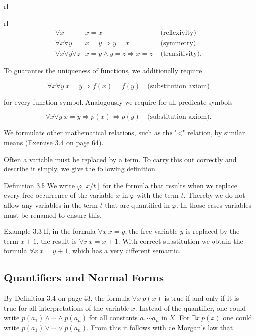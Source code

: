 \documentclass[10pt]{book}
\begin{document}
\begin{center}
\begin{tabular}{rl}
\begin{tabular}{rl}
\[
\begin{array}{rll}
\forall x & x=x & \text{ (reflexivity) } \\
\forall x \forall y & x=y \Rightarrow y=x & \text{ (symmetry) } \tag{3.1}\\
\forall x \forall y \forall z & x=y \wedge y=z \Rightarrow x=z & \text{ (transitivity).}
\end{array}
\]

To guarantee the uniqueness of functions, we additionally require

\begin{equation*}
\forall x \forall y \ x=y \Rightarrow f(x)=f(y) \quad \text{(substitution axiom)} \tag{3.2}
\end{equation*}

for every function symbol. Analogously we require for all predicate symbols

\begin{equation*}
\forall x \forall y \ x=y \Rightarrow p(x) \Leftrightarrow p(y) \quad \text{(substitution axiom).} \tag{3.3}
\end{equation*}

We formulate other mathematical relations, such as the "<" relation, by similar means (Exercise 3.4 on page 64).

Often a variable must be replaced by a term. To carry this out correctly and describe it simply, we give the following definition.

Definition 3.5 We write $\varphi[x / t]$ for the formula that results when we replace every free occurrence of the variable $x$ in $\varphi$ with the term $t$. Thereby we do not allow any variables in the term $t$ that are quantified in $\varphi$. In those cases variables must be renamed to ensure this.

Example 3.3 If, in the formula $\forall x \ x=y$, the free variable $y$ is replaced by the term $x+1$, the result is $\forall x \ x=x+1$. With correct substitution we obtain the formula $\forall x \ x=y+1$, which has a very different semantic.

\subsection{Quantifiers and Normal Forms}
By Definition 3.4 on page 43, the formula $\forall x \ p(x)$ is true if and only if it is true for all interpretations of the variable $x$. Instead of the quantifier, one could write $p(a_{1}) \wedge \cdots \wedge p(a_{n})$ for all constants $a_{1} \cdots a_{n}$ in $K$. For $\exists x \ p(x)$ one could write $p(a_{1}) \vee \cdots \vee p(a_{n})$. From this it follows with de Morgan's law that


\end{tabular}
\end{tabular}
\end{center}
\end{document}
